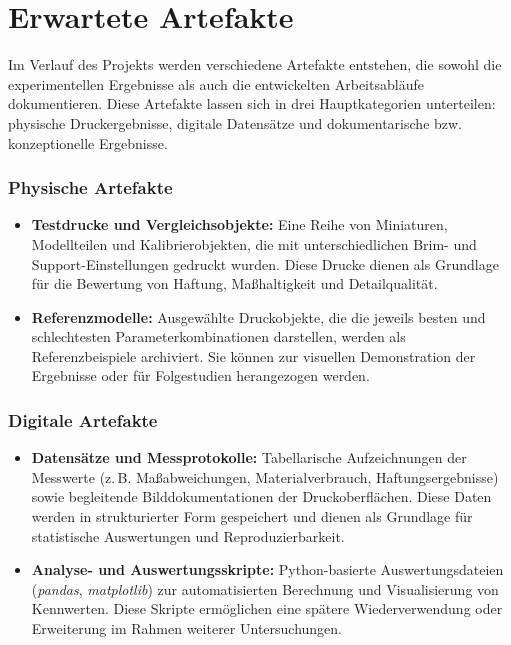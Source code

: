 \chapter{Erwartete Artefakte}
\label{cha:Erwartete Artefakte}

Im Verlauf des Projekts werden verschiedene Artefakte entstehen, die sowohl die experimentellen Ergebnisse als auch die entwickelten Arbeitsabläufe dokumentieren.  
Diese Artefakte lassen sich in drei Hauptkategorien unterteilen: physische Druckergebnisse, digitale Datensätze und dokumentarische bzw. konzeptionelle Ergebnisse.

\subsection{Physische Artefakte}

\begin{itemize}
  \item \textbf{Testdrucke und Vergleichsobjekte:} 
  Eine Reihe von Miniaturen, Modellteilen und Kalibrierobjekten, die mit unterschiedlichen Brim- und Support-Einstellungen gedruckt wurden.  
  Diese Drucke dienen als Grundlage für die Bewertung von Haftung, Maßhaltigkeit und Detailqualität.
  
  \item \textbf{Referenzmodelle:} 
  Ausgewählte Druckobjekte, die die jeweils besten und schlechtesten Parameterkombinationen darstellen, werden als Referenzbeispiele archiviert.  
  Sie können zur visuellen Demonstration der Ergebnisse oder für Folgestudien herangezogen werden.
\end{itemize}

\subsection{Digitale Artefakte}

\begin{itemize}
  \item \textbf{Datensätze und Messprotokolle:} 
  Tabellarische Aufzeichnungen der Messwerte (z.\,B. Maßabweichungen, Materialverbrauch, Haftungsergebnisse) sowie begleitende Bilddokumentationen der Druckoberflächen.  
  Diese Daten werden in strukturierter Form gespeichert und dienen als Grundlage für statistische Auswertungen und Reproduzierbarkeit.
  
  \item \textbf{Analyse- und Auswertungsskripte:} 
  Python-basierte Auswertungsdateien (\textit{pandas}, \textit{matplotlib}) zur automatisierten Berechnung und Visualisierung von Kennwerten.  
  Diese Skripte ermöglichen eine spätere Wiederverwendung oder Erweiterung im Rahmen weiterer Untersuchungen.
\end{itemize}

